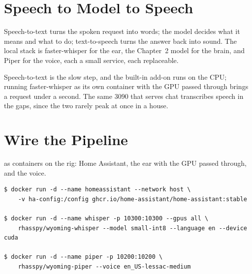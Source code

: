 \section{Speech to Model to Speech}%

 Speech-to-text turns the spoken request
into words; the model decides what it means and what to do; text-to-speech turns
the answer back into sound. The local stack is faster-whisper for the ear, the
Chapter~2 model for the brain, and Piper for the voice, each a small service, each
replaceable.


 Speech-to-text is the slow step, and the
built-in add-on runs on the CPU; running faster-whisper as its own container with
the GPU passed through brings a request under a second. The same 3090 that serves
chat transcribes speech in the gaps, since the two rarely peak at once in a house.



\section{Wire the Pipeline}

 as containers on the rig:
Home Assistant, the ear with the GPU passed through, and the voice.

\begin{verbatim}
$ docker run -d --name homeassistant --network host \
    -v ha-config:/config ghcr.io/home-assistant/home-assistant:stable

$ docker run -d --name whisper -p 10300:10300 --gpus all \
    rhasspy/wyoming-whisper --model small-int8 --language en --device cuda

$ docker run -d --name piper -p 10200:10200 \
    rhasspy/wyoming-piper --voice en_US-lessac-medium
\end{verbatim}

